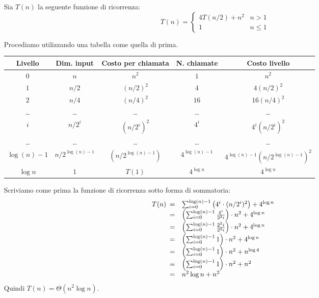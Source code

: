 \begin{eg}
    Sia $T(n)$ la seguente funzione di ricorrenza:
    \[T(n)=\begin{cases}
        4T(n/2)+n^2 & n>1\\
        1 & n\leq1
    \end{cases}\]

    \bigskip\noindent
    Procediamo utilizzando una tabella come quella di prima.

    \begin{table}[ht!]
        \renewcommand{\arraystretch}{1.2}
        \centering
        \begin{tabular}{|c|c|c|c|c|}
            \hline
            \textbf{Livello} & \textbf{Dim. input} & \textbf{Costo per chiamata} & \textbf{N. chiamate} & \textbf{Costo livello}\\
            \hline
            $0$ & $n$ & $n^2$ & $1$ & $n^2$\\
            \hline
            $1$ & $n/2$ & $(n/2)^2$ & $4$ & $4(n/2)^2$\\
            \hline
            $2$ & $n/4$ & $(n/4)^2$ & $16$ & $16(n/4)^2$\\
            \hline
            \dots & \dots & \dots & \dots & \dots\\
            \hline
            $i$ & $n/2^i$ & $(n/2^i)^2$ & $4^i$ & $4^i(n/2^i)^2$\\
            \hline
            \dots & \dots & \dots & \dots & \dots\\
            \hline
            $\log(n)-1$ & $n/2^{\log(n)-1}$ & $(n/2^{\log(n)-1})$ & $4^{\log(n)-1}$ & $4^{\log(n)-1}(n/2^{\log(n)-1})^2$\\
            \hline
            $\log n$ & $1$ & $T(1)$ & $4^{\log n}$ & $4^{\log n}$\\
            \hline
        \end{tabular}
    \end{table}\noindent
    Scriviamo come prima la funzione di ricorrenza sotto forma di sommatoria:
    \[T(n)\begin{array}[t]{cl}
        = & \sum_{i=0}^{\log(n)-1}\left(4^i\cdot(n/2^i)^2\right)+4^{\log n}\\
        = & \left(\sum_{i=0}^{\log(n)-1}\frac{4^i}{2^2i}\right)\cdot n^2+4^{\log n}\\
        = & \left(\sum_{i=0}^{\log(n)-1}\frac{2^2i}{2^2i}\right)\cdot n^2+4^{\log n}\\
        = & \left(\sum_{i=0}^{\log(n)-1}1\right)\cdot n^2+4^{\log n}\\
        = & \left(\sum_{i=0}^{\log(n)-1}1\right)\cdot n^2+n^{\log 4}\\
        = & \left(\sum_{i=0}^{\log(n)-1}1\right)\cdot n^2+n^2\\
        = & n^2\log n+n^2\\
    \end{array}\]
    Quindi $T(n)=\Theta(n^2\log n)$.
\end{eg}

